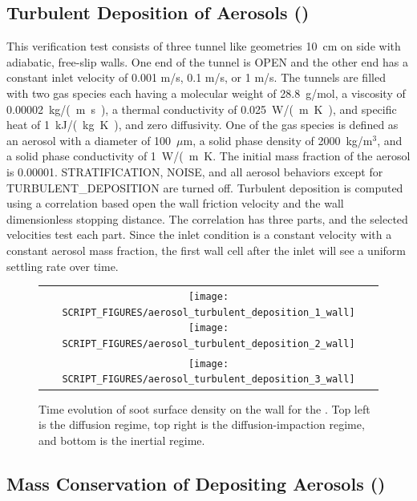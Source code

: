 \documentclass[11pt]{book}
\begin{document}
\subsection{Turbulent Deposition of Aerosols (\texorpdfstring{}{aerosol\_turbulent\_deposition})}
	\label{aerosol_turbulent_deposition}

This verification test consists of three tunnel like geometries 10~cm on side with adiabatic, free-slip walls. One end of the tunnel is {\ct OPEN} and the other end has a constant inlet velocity of 0.001 m/s, 0.1 m/s, or 1 m/s. The tunnels are filled with two gas species each having a molecular weight of 28.8~g/mol, a viscosity of 0.00002~\si{kg/(m.s)}, a thermal conductivity of 0.025~\si{W/(m.K)}, and specific heat of 1~\si{kJ/(kg.K)}, and zero diffusivity. One of the gas species is defined as an aerosol with a diameter of 100~$\mu$m, a solid phase density of 2000~kg/m$^3$, and a solid phase conductivity of 1~\si{W/(m.K}. The initial mass fraction of the aerosol is 0.00001. {\ct STRATIFICATION}, {\ct NOISE}, and all aerosol behaviors except for {\ct TURBULENT\_DEPOSITION} are turned off. Turbulent deposition is computed using a correlation based open the wall friction velocity and the wall dimensionless stopping distance. The correlation has three parts, and the selected velocities test each part. Since the inlet condition is a constant velocity with a constant aerosol mass fraction, the first wall cell after the inlet will see a uniform settling rate over time.

\begin{figure}[ht]
	\centering
	\begin{tabular}{c}
		\texttt{[image: SCRIPT\_FIGURES/aerosol\_turbulent\_deposition\_1\_wall]}
		\texttt{[image: SCRIPT\_FIGURES/aerosol\_turbulent\_deposition\_2\_wall]} \\
		\texttt{[image: SCRIPT\_FIGURES/aerosol\_turbulent\_deposition\_3\_wall]}
	\end{tabular}
	\caption[Wall surface densities for the  case]{Time evolution of soot surface density on the wall for the . Top left is the diffusion regime, top right is the diffusion-impaction regime, and bottom is the inertial regime.}
	\label{fig:turbulent_deposition}
\end{figure}

\subsection{Mass Conservation of Depositing Aerosols (\texorpdfstring{}{propane\_flame\_deposition})}
\label{propane_flame_deposition}
\end{document}
